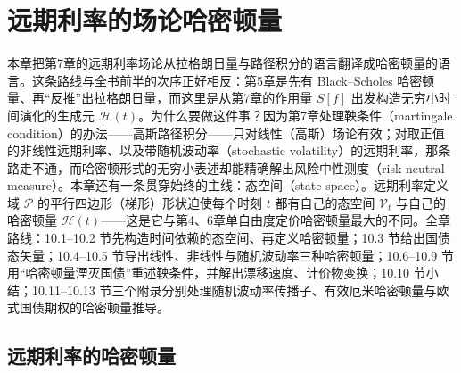 \chapter{远期利率的场论哈密顿量}

本章把第7章的远期利率场论从拉格朗日量与路径积分的语言翻译成哈密顿量的语言。这条路线与全书前半的次序正好相反：第5章是先有 Black–Scholes 哈密顿量、再“反推”出拉格朗日量，而这里是从第7章的作用量 $S[f]$ 出发构造无穷小时间演化的生成元 $\mathcal{H}(t)$。为什么要做这件事？因为第7章处理鞅条件（martingale condition）的办法——高斯路径积分——只对线性（高斯）场论有效；对取正值的非线性远期利率、以及带随机波动率（stochastic volatility）的远期利率，那条路走不通，而哈密顿形式的无穷小表述却能精确解出风险中性测度（risk-neutral measure）。本章还有一条贯穿始终的主线：态空间（state space）。远期利率定义域 $\mathcal{P}$ 的平行四边形（梯形）形状迫使每个时刻 $t$ 都有自己的态空间 $\mathcal{V}_t$ 与自己的哈密顿量 $\mathcal{H}(t)$——这是它与第4、6章单自由度定价哈密顿量最大的不同。全章路线：10.1--10.2 节先构造时间依赖的态空间、再定义哈密顿量；10.3 节给出国债态矢量；10.4--10.5 节导出线性、非线性与随机波动率三种哈密顿量；10.6--10.9 节用“哈密顿量湮灭国债”重述鞅条件，并解出漂移速度、计价物变换；10.10 节小结；10.11--10.13 节三个附录分别处理随机波动率传播子、有效厄米哈密顿量与欧式国债期权的哈密顿量推导。

\section{远期利率的哈密顿量}

